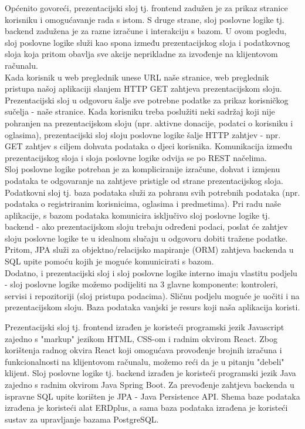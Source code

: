 		\eject

		Općenito govoreći, prezentacijski sloj tj. frontend zadužen je za prikaz stranice korisniku i omogućavanje rada s istom. S druge strane, sloj poslovne logike tj. backend zadužena je za razne izračune i interakciju s bazom. U ovom pogledu, sloj poslovne logike služi kao spona između prezentacijskog sloja i podatkovnog sloja koja pritom obavlja sve akcije neprikladne za izvođenje na klijentovom računalu.\\[2pt]

		Kada korisnik u web preglednik unese URL naše stranice, web preglednik pristupa našoj aplikaciji slanjem HTTP GET zahtjeva prezentacijskom sloju. Prezentacijski sloj u odgovoru šalje sve potrebne podatke za prikaz korisničkog sučelja - naše stranice.
		Kada korisniku treba poslužiti neki sadržaj koji nije pohranjen na prezentacijskom sloju (npr. aktivne donacije, podatci o korisniku i oglasima), prezentacijski sloj sloju poslovne logike šalje HTTP zahtjev - npr. GET zahtjev s ciljem dohvata podataka o djeci korisnika.
		Komunikacija između prezentacijskog sloja i sloja poslovne logike odvija se po REST načelima.\\[2pt]

		Sloj poslovne logike potreban je za kompliciranije izračune, dohvat i izmjenu podataka te odgovaranje na zahtjeve pristigle od strane prezentacijskog sloja.
		Podatkovni sloj tj. baza podataka služi za pohranu svih potrebnih podataka (npr. podataka o registriranim korisnicima, oglasima i predmetima). Pri radu naše aplikacije, s bazom podataka komunicira isključivo sloj poslovne logike tj. backend - ako prezentacijskom sloju trebaju određeni podaci, poslat će zahtjev sloju poslovne logike te u idealnom slučaju u odgovoru dobiti tražene podatke. Pritom, JPA služi za objektno/relacijsko mapiranje (ORM) zahtjeva backenda u SQL upite pomoću kojih je moguće komunicirati s bazom.\\[2pt]

		Dodatno, i prezentacijski sloj i sloj poslovne logike interno imaju vlastitu podjelu - sloj poslovne logike možemo podijeliti na 3 glavne komponente: kontroleri, servisi i repozitoriji (sloj pristupa podacima). Sličnu podjelu moguće je uočiti i na prezentacijskom sloju. Baza podataka vanjski je resurs koji naša aplikacija koristi.

		\eject

		Prezentacijski sloj tj. frontend izrađen je koristeći programski jezik Javascript zajedno s "markup" jezikom HTML, CSS-om i radnim okvirom React. Zbog korištenja radnog okvira React koji omogućava provođenje brojnih izračuna i funkcionalnosti na klijentovom računalu, možemo reći da je u pitanju "debeli" klijent.
		Sloj poslovne logike tj. backend izrađen je koristeći programski jezik Java zajedno s radnim okvirom Java Spring Boot. Za prevođenje zahtjeva backenda u ispravne SQL upite korišten je JPA - Java Persistence API.
		Shema baze podataka izrađena je koristeći alat ERDplus, a sama baza podataka izrađena je koristeći sustav za upravljanje bazama PostgreSQL.

